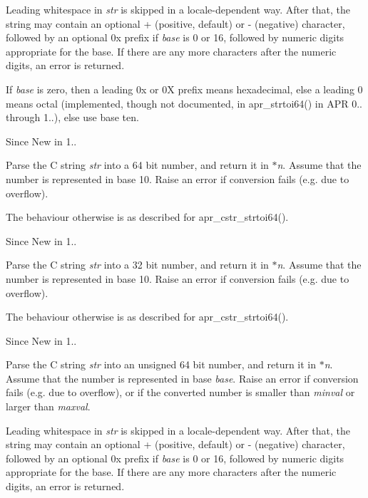 Leading whitespace in {\itshape str} is skipped in a locale-\/dependent way. After that, the string may contain an optional \textquotesingle{}+\textquotesingle{} (positive, default) or \textquotesingle{}-\/\textquotesingle{} (negative) character, followed by an optional \textquotesingle{}0x\textquotesingle{} prefix if {\itshape base} is 0 or 16, followed by numeric digits appropriate for the base. If there are any more characters after the numeric digits, an error is returned.

If {\itshape base} is zero, then a leading \textquotesingle{}0x\textquotesingle{} or \textquotesingle{}0X\textquotesingle{} prefix means hexadecimal, else a leading \textquotesingle{}0\textquotesingle{} means octal (implemented, though not documented, in apr\+\_\+strtoi64() in A\+PR 0.. through 1..), else use base ten.

\begin{DoxySince}{Since}
New in 1..
\end{DoxySince}
Parse the C string {\itshape str} into a 64 bit number, and return it in {\itshape $\ast$n}. Assume that the number is represented in base 10. Raise an error if conversion fails (e.\+g. due to overflow).

The behaviour otherwise is as described for apr\+\_\+cstr\+\_\+strtoi64().

\begin{DoxySince}{Since}
New in 1..
\end{DoxySince}
Parse the C string {\itshape str} into a 32 bit number, and return it in {\itshape $\ast$n}. Assume that the number is represented in base 10. Raise an error if conversion fails (e.\+g. due to overflow).

The behaviour otherwise is as described for apr\+\_\+cstr\+\_\+strtoi64().

\begin{DoxySince}{Since}
New in 1..
\end{DoxySince}
Parse the C string {\itshape str} into an unsigned 64 bit number, and return it in {\itshape $\ast$n}. Assume that the number is represented in base {\itshape base}. Raise an error if conversion fails (e.\+g. due to overflow), or if the converted number is smaller than {\itshape minval} or larger than {\itshape maxval}.

Leading whitespace in {\itshape str} is skipped in a locale-\/dependent way. After that, the string may contain an optional \textquotesingle{}+\textquotesingle{} (positive, default) or \textquotesingle{}-\/\textquotesingle{} (negative) character, followed by an optional \textquotesingle{}0x\textquotesingle{} prefix if {\itshape base} is 0 or 16, followed by numeric digits appropriate for the base. If there are any more characters after the numeric digits, an error is returned.

